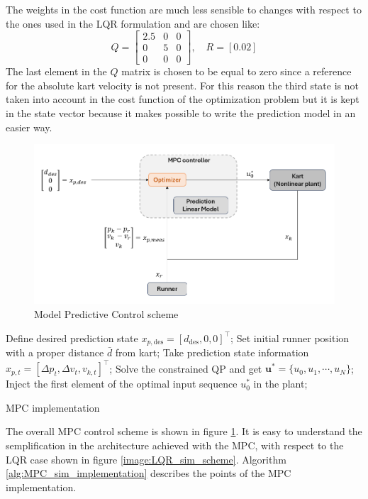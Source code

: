 \documentclass[a4paper,12pt,oneside]{book}
\begin{document}
\bigskip
The weights in the cost function are much less sensible to changes with respect to the ones used in the LQR formulation and are chosen like:
\begin{equation}
    Q =
    \begin{bmatrix}
        2.5 & 0 & 0 \\
        0 & 5 & 0 \\
        0 & 0 & 0
    \end{bmatrix},
    \quad
    R = [0.02]    
\end{equation}
The last element in the $Q$ matrix is chosen to be equal to zero since a reference for the absolute kart velocity is not present. 
For this reason the third state is not taken into account in the cost function of the optimization problem but it is kept in the state vector because it makes possible to write the prediction model in an easier way.

\begin{figure}
	\centering
	\includegraphics[width=1.0\textwidth]{MPC_sim_scheme.png}
	\caption{Model Predictive Control scheme}
	\label{image:MPC_sim_scheme}
\end{figure}

\begin{algorithm}
\begin{algorithmic}[1]
	\State Define desired prediction state $x_{p,\text{des}} = [d_{\text{des}}, 0, 0]^\top$;
	\State Set initial runner position with a proper distance $\bar{d}$ from kart;
		\State Take prediction state information $x_{p,t} = [\Delta p_t, \Delta v_t, v_{k,t}]^\top$;
		\State Solve the constrained QP and get $\boldsymbol{u}^* = \{u_0, u_1, \cdots, u_N\}$; 
		\State Inject the first element of the optimal input sequence $u_0^*$ in the plant;
	\EndFor
\caption{MPC implementation}
\label{alg:MPC_sim_implementation}
\end{algorithmic}
\end{algorithm}
\bigskip
The overall MPC control scheme is shown in figure \ref{image:MPC_sim_scheme}.
It is easy to understand the semplification in the architecture achieved with the MPC, with respect to the LQR case shown in figure \ref{image:LQR_sim_scheme}.
 Algorithm \ref{alg:MPC_sim_implementation} describes the points of the MPC implementation.
\end{document}
